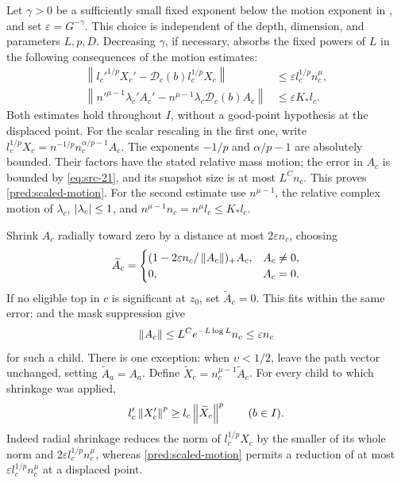 Let \(\gamma>0\) be a sufficiently small fixed exponent below the
motion exponent in , and set
\(\varepsilon=G^{-\gamma}\). This choice is independent of the depth,
dimension, and parameters \(L,p,D\). Decreasing \(\gamma\), if
necessary, absorbs the fixed powers of \(L\) in the following
consequences of the motion estimates:
\begin{align}
 \left\|l_c'^{1/p}X_c'
       -\mathcal D_c(b)l_c^{1/p}X_c\right\|
       &\le\varepsilon l_c^{1/p}n_c^\mu,
       \label{pred:scaled-motion}\\
 \left\|n'^{\mu-1}\lambda_c'A_c'
       -n^{\mu-1}\lambda_c\mathcal D_c(b)A_c\right\|
       &\le\varepsilon K_*l_c.
       \label{pred:numerator-motion}
\end{align}
Both estimates hold throughout \(I\), without a good-point hypothesis
at the displaced point. For the scalar rescaling in the first one,
write \(l_c^{1/p}X_c=n^{-1/p}n_c^{\alpha/p-1}A_c\).
The exponents \(-1/p\) and \(\alpha/p-1\) are absolutely bounded.
Their factors have the stated relative mass motion; the error in
\(A_c\) is bounded by \eqref{eq:src-21}, and its snapshot size is at
most \(L^C n_c\). This proves \eqref{pred:scaled-motion}.
For the second estimate use \(n^{\mu-1}\), the relative complex motion
of \(\lambda_c\), \(\left|\lambda_c\right|\le1\), and
\(n^{\mu-1}n_c=n^\mu l_c\le K_*l_c\).

Shrink \(A_c\) radially toward zero by a distance at most
\(2\varepsilon n_c\), choosing
\[
 \widetilde A_c=
 \begin{cases}
   (1-2\varepsilon n_c/\left\|A_c\right\|)_+ A_c,& A_c\ne0,\\
   0,& A_c=0.
 \end{cases}
\]
If no eligible top in \(c\) is significant at \(z_0\), set
\(\widetilde A_c=0\). This fits within the same error:
 and the mask suppression give
\[
 \left\|A_c\right\|\le L^C e^{-L\log L}n_c\le\varepsilon n_c
\]
for such a child. There is one exception: when \(\upsilon<1/2\),
leave the path vector unchanged, setting \(\widetilde A_a=A_a\).
Define \(\widetilde X_c=n_c^{\mu-1}\widetilde A_c\).
For every child to which shrinkage was applied,
\begin{equation}
 l_c'\left\|X_c'\right\|^p\ge l_c\left\|\widetilde X_c\right\|^p
             \qquad(b\in I).
 \label{pred:denominator-lower-bound}
\end{equation}
Indeed radial shrinkage reduces the norm of \(l_c^{1/p}X_c\) by
the smaller of its whole norm and \(2\varepsilon l_c^{1/p}n_c^\mu\),
whereas \eqref{pred:scaled-motion} permits a reduction of at most
\(\varepsilon l_c^{1/p}n_c^\mu\) at a displaced point.

